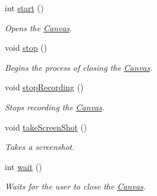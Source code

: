 \begin{DoxyCompactItemize}
int \hyperlink{classtsgl_1_1_canvas_a654315f9b08a9b3b072eebf4b4d8ae89}{start} ()
\begin{DoxyCompactList}\small\item\em Opens the \hyperlink{classtsgl_1_1_canvas}{Canvas}. \end{DoxyCompactList}\item 
void \hyperlink{classtsgl_1_1_canvas_a46cd37a9f2a146e57b4e0273faf6485c}{stop} ()
\begin{DoxyCompactList}\small\item\em Begins the process of closing the \hyperlink{classtsgl_1_1_canvas}{Canvas}. \end{DoxyCompactList}\item 
void \hyperlink{classtsgl_1_1_canvas_ac6035d87aa3bf077031bc0bb6f419b17}{stop\+Recording} ()
\begin{DoxyCompactList}\small\item\em Stops recording the \hyperlink{classtsgl_1_1_canvas}{Canvas}. \end{DoxyCompactList}\item 
void \hyperlink{classtsgl_1_1_canvas_ac035f43763b198f6915a0772973a5ea9}{take\+Screen\+Shot} ()
\begin{DoxyCompactList}\small\item\em Takes a screenshot. \end{DoxyCompactList}\item 
int \hyperlink{classtsgl_1_1_canvas_a39e69fd4d1ad8cf0e22ecea12f1ddf08}{wait} ()
\begin{DoxyCompactList}\small\item\em Waits for the user to close the \hyperlink{classtsgl_1_1_canvas}{Canvas}. \end{DoxyCompactList}\end{DoxyCompactItemize}
